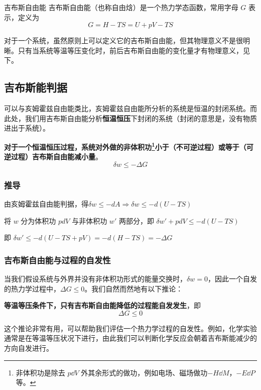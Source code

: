 
\begin{issues}
\end{issues}


\begin{definition}{吉布斯自由能}
吉布斯自由能（也称自由焓）是一个热力学态函数，常用字母 $G$ 表示，定义为
\begin{equation}
G=H-TS=U+pV-TS
\end{equation}
\end{definition}

对于一个系统，虽然原则上可以定义它的吉布斯自由能，但其物理意义不是很明晰。只有当系统等温等压变化时，前后吉布斯自由能的变化量才有物理意义，见下。

\subsection{吉布斯能判据}
可以与亥姆霍兹自由能类比，亥姆霍兹自由能所分析的系统是恒温的封闭系统。而此处，我们用吉布斯自由能分析\textbf{恒温恒压}下封闭的系统（封闭的意思是，没有物质进出于系统）。

\begin{theorem}{}
\textbf{对于一个恒温恒压过程，系统对外做的非体积功\footnote{非体积功是除去 $p\dd V$ 外其余形式的做功，例如电场、磁场做功$-H\dd M$，$-E\dd P$ 等。}小于（不可逆过程）或等于（可逆过程）吉布斯自由能减小量}。
\begin{equation}
\delta w \le -\Delta G
\end{equation}
\end{theorem}
\subsubsection{推导}

由亥姆霍兹自由能判据，得$\delta w \le -dA\Rightarrow \delta w \le -d(U-TS)$

将 $w$ 分为体积功 $pdV$ 与非体积功 $w'$ 两部分，即
$\delta w' + pdV \le -d(U-TS)$

即 $\delta w'  \le -d(U-TS+pV) = -d(H-TS) = -\Delta G$
\subsubsection{吉布斯自由能与过程的自发性}
当我们假设系统与外界并没有非体积功形式的能量交换时，$\delta w=0$，因此一个自发的热力学过程中，$\Delta G\le 0$。我们自然而然地有以下推论：
\begin{corollary}{}
\textbf{等温等压条件下，只有吉布斯自由能降低的过程能自发发生}，即
\begin{equation}
\Delta G \le 0
\end{equation}
\end{corollary}
这个推论非常有用，可以帮助我们评估一个热力学过程的自发性。例如，化学实验通常是在等温等压状况下进行，由此我们可以判断化学反应会朝着吉布斯能减少的方向自发进行。

